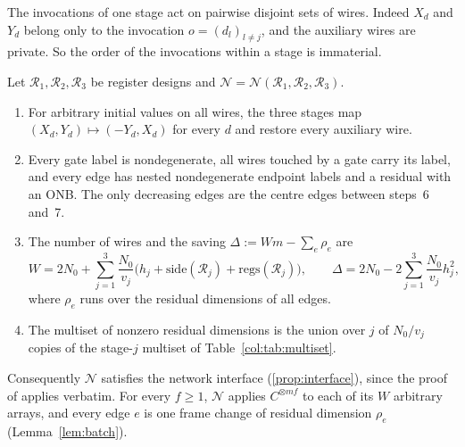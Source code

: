 The invocations of one stage act on pairwise disjoint sets of wires. Indeed $X_d$ and $Y_d$ belong
only to the invocation $o=(d_l)_{l\ne j}$, and the auxiliary wires are private. So the order of the
invocations within a stage is immaterial.

\begin{proposition}\label{col:prop:network}
Let $\mathcal R_1,\mathcal R_2,\mathcal R_3$ be register designs and $\mathcal N=\mathcal N(\mathcal R_1,\mathcal R_2,\mathcal R_3)$.
\begin{enumerate}
\item[(a)] For arbitrary initial values on all wires, the three stages map
  $(X_d,Y_d)\mapsto(-Y_d,X_d)$ for every $d$ and restore every auxiliary wire.
\item[(b)] Every gate label is nondegenerate, all wires touched by a gate carry its label, and every edge
  has nested nondegenerate endpoint labels and a residual with an ONB. The only decreasing edges are the
  centre edges between steps~6 and~7.
\item[(c)] The number of wires and the saving $\Delta:=Wm-\sum_e\rho_e$ are
  \[
    W=2N_0+\sum_{j=1}^3\frac{N_0}{v_j}\big(h_j+\mathrm{side}(\mathcal R_j)+\mathrm{regs}(\mathcal R_j)\big),\qquad
    \Delta=2N_0-2\sum_{j=1}^3\frac{N_0}{v_j}h_j^2 ,
  \]
  where $\rho_e$ runs over the residual dimensions of all edges.
\item[(d)] The multiset of nonzero residual dimensions is the union over $j$ of $N_0/v_j$ copies of the
  stage-$j$ multiset of Table~\ref{col:tab:multiset}.
\end{enumerate}
Consequently $\mathcal N$ satisfies the network interface (\ref{prop:interface}), since the proof of
\cite[Proposition~2.4]{oai} applies verbatim. For every $f\ge1$, $\mathcal N$ applies
$C^{\otimes mf}$ to each of its $W$ arbitrary arrays, and every edge $e$ is one frame change of residual
dimension $\rho_e$ (Lemma~\ref{lem:batch}).
\end{proposition}

